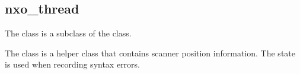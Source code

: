 %
%
%
%
%

\subsection{nxo\_thread}
\label{nxo_thread}

The  class is a subclass of the  class.

The  class is a helper class that contains scanner position
information.  The  state is used when recording syntax
errors.

